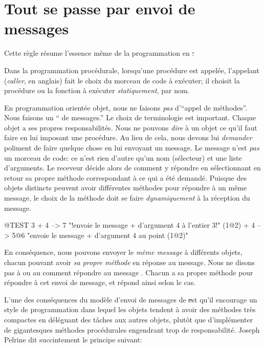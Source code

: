 \documentclass[a4paper,10pt,twoside]{book}
\begin{document}
\section{Tout se passe par envoi de messages} %


Cette règle résume l'essence même de la programmation en \st.

Dans la programmation procédurale, lorsqu'une procédure est appelée, l'appelant (\emph{caller}, en anglais) fait le choix du morceau de code à exécuter; il choisit la procédure ou la fonction à exécuter \emph{statiquement}, par nom.  

En programmation orientée objet, nous ne faisons \emph{pas}
d'``appel de méthodes''. Nous faisons un ``
de messages.'' %
Le choix de terminologie est important.
Chaque objet a ses propres responsabilités.
Nous ne pouvons \emph{dire} à un objet ce qu'il faut faire en lui imposant 
une procédure.
Au lieu de cela, nous devons lui \emph{demander} poliment de faire quelque chose en lui envoyant un message.
Le message n'est \emph{pas} un morceau de code: ce n'est rien d'autre qu'un nom (sélecteur) et une liste d'arguments.
Le receveur décide alors de comment y répondre en sélectionnant en retour
sa propre méthode correspondant à ce qui a été demandé.
Puisque des objets distincts peuvent avoir différentes méthodes pour répondre à un même message, le choix de la méthode doit se faire \emph{dynamiquement} à la réception du message.
\begin{code}{@TEST}
3 + 4         --> 7          "!envoie le message + d'argument 4 à l'entier  3!"
(1@2) + 4 --> 5@6    "envoie le message + d'argument 4 au point (1@2)"
\end{code}
\noindent
En conséquence, nous pouvons envoyer le \emph{même message} à différents objets, chacun pouvant avoir \emph{sa propre méthode} en réponse au message.
Nous ne disons pas à   ou au   comment répondre au message .
Chacun a sa propre méthode pour répondre à cet envoi de message, et répond ainsi selon le cas.

L'une des conséquences du modèle d'envoi de messages de \st est
qu'il encourage un style de programmation dans lequel les objets
tendent à avoir des méthodes très compactes en déléguant des
tâches aux autres objets, plutôt que d'implémenter de
gigantesques méthodes procédurales engendrant trop de
responsabilité. %
Joseph Pelrine
dit succintement le principe suivant:
\end{document}
